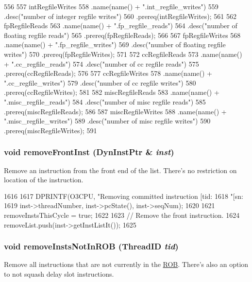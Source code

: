 \begin{DoxyCode}
{556 
557     intRegfileWrites
558         .name(name() + ".int_regfile_writes")
559         .desc("number of integer regfile writes")
560         .prereq(intRegfileWrites);
561 
562     fpRegfileReads
563         .name(name() + ".fp_regfile_reads")
564         .desc("number of floating regfile reads")
565         .prereq(fpRegfileReads);
566 
567     fpRegfileWrites
568         .name(name() + ".fp_regfile_writes")
569         .desc("number of floating regfile writes")
570         .prereq(fpRegfileWrites);
571 
572     ccRegfileReads
573         .name(name() + ".cc_regfile_reads")
574         .desc("number of cc regfile reads")
575         .prereq(ccRegfileReads);
576 
577     ccRegfileWrites
578         .name(name() + ".cc_regfile_writes")
579         .desc("number of cc regfile writes")
580         .prereq(ccRegfileWrites);
581 
582     miscRegfileReads
583         .name(name() + ".misc_regfile_reads")
584         .desc("number of misc regfile reads")
585         .prereq(miscRegfileReads);
586 
587     miscRegfileWrites
588         .name(name() + ".misc_regfile_writes")
589         .desc("number of misc regfile writes")
590         .prereq(miscRegfileWrites);
591 }
\end{DoxyCode}
\hypertarget{classFullO3CPU_a6f40adbce5903c52e6460ab8c17489ef}{
\subsubsection[{removeFrontInst}]{\setlength{\rightskip}{0pt plus 5cm}void removeFrontInst ({\bf DynInstPtr} \& {\em inst})}}
\label{classFullO3CPU_a6f40adbce5903c52e6460ab8c17489ef}
Remove an instruction from the front end of the list. There's no restriction on location of the instruction. 


\begin{DoxyCode}
1616 {
1617     DPRINTF(O3CPU, "Removing committed instruction [tid:%
1618             "[sn:%
1619             inst->threadNumber, inst->pcState(), inst->seqNum);
1620 
1621     removeInstsThisCycle = true;
1622 
1623     // Remove the front instruction.
1624     removeList.push(inst->getInstListIt());
1625 }
\end{DoxyCode}
\hypertarget{classFullO3CPU_a37bf3e194e9e98e4e7366e35fb6ebf49}{
\subsubsection[{removeInstsNotInROB}]{\setlength{\rightskip}{0pt plus 5cm}void removeInstsNotInROB ({\bf ThreadID} {\em tid})}}
\label{classFullO3CPU_a37bf3e194e9e98e4e7366e35fb6ebf49}
Remove all instructions that are not currently in the \hyperlink{classROB}{ROB}. There's also an option to not squash delay slot instructions. 



